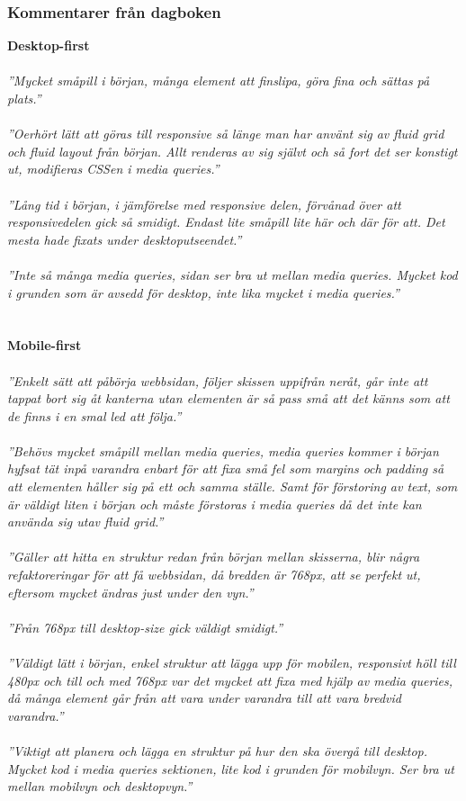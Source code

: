 \documentclass[11pt]{article}
\begin{document}
\subsubsection{Kommentarer från dagboken}

\textbf{Desktop-first}
\\\\
\textit{”Mycket småpill i början, många element att finslipa, göra fina och sättas på plats.”}\\\\
\textit{”Oerhört lätt att göras till responsive så länge man har använt sig av fluid grid och fluid layout från början. Allt renderas av sig självt och så fort det ser konstigt ut, modifieras CSSen i media queries.”}\\\\
\textit{”Lång tid i början, i jämförelse med responsive delen, förvånad över att responsivedelen gick så smidigt. Endast lite småpill lite här och där för att. Det mesta hade fixats under desktoputseendet.”}\\\\
\textit{”Inte så många media queries, sidan ser bra ut mellan media queries. Mycket kod i grunden som är avsedd för desktop, inte lika mycket i media queries.”}\\\\
\\
\textbf{Mobile-first}
\\\\
\textit{”Enkelt sätt att påbörja webbsidan, följer skissen uppifrån neråt, går inte att tappat bort sig åt kanterna utan elementen är så pass små att det känns som att de finns i en smal led att följa.”}\\\\
\textit{”Behövs mycket småpill mellan media queries, media queries kommer i början hyfsat tät inpå varandra enbart för att fixa små fel som margins och padding så att elementen håller sig på ett och samma ställe. Samt för förstoring av text, som är väldigt liten i början och måste förstoras i media queries då det inte kan använda sig utav fluid grid.”}\\\\
\textit{”Gäller att hitta en struktur redan från början mellan skisserna, blir några refaktoreringar för att få webbsidan, då bredden är 768px, att se perfekt ut, eftersom mycket ändras just under den vyn.”}\\\\
\textit{”Från 768px till desktop-size gick väldigt smidigt.”}\\\\
\textit{”Väldigt lätt i början, enkel struktur att lägga upp för mobilen, responsivt höll till 480px och till och med 768px var det mycket att fixa med hjälp av media queries, då många element går från att vara under varandra till att vara bredvid varandra.”}\\\\
\textit{”Viktigt att planera och lägga en struktur på hur den ska övergå till desktop. Mycket kod i media queries sektionen, lite kod i grunden för mobilvyn.  Ser bra ut mellan mobilvyn och desktopvyn.”}\\\\
\end{document}
